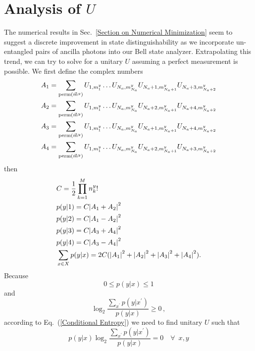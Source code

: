 \documentclass[aps,pra,twocolumn,showpacs,superscriptaddress,floatfix,10pt]{revtex4}
\begin{document}
\section{Analysis of $U$}
\label{Section on U Analysis}
The numerical results in Sec.~\ref{Section on Numerical Minimization} seem to suggest a discrete improvement in state distinguishability as we incorporate un-entangled pairs of ancilla photons into our Bell state analyzer. Extrapolating this trend, we can try to solve for a unitary $U$ assuming a perfect measurement is possible. 
We first define the complex numbers
\begin{eqnarray}
	\small{ A_1 = \sum\limits_{\textrm{perm}(\vec{m}^y)} U_{1,m^y_1} \dots U_{N_a,m^y_{N_a}} U_{N_a+1,m^y_{N_a+1}} U_{N_a+3,m^y_{N_a+2}}} \nonumber\\
	 A_2 = \sum\limits_{\textrm{perm}(\vec{m}^y)} U_{1,m^y_1} \dots U_{N_a,m^y_{N_a}} U_{N_a+2,m^y_{N_a+1}} U_{N_a+4,m^y_{N_a+2}} \nonumber\\
	 A_3 = \sum\limits_{\textrm{perm}(\vec{m}^y)} U_{1,m^y_1} \dots U_{N_a,m^y_{N_a}} U_{N_a+1,m^y_{N_a+1}} U_{N_a+4,m^y_{N_a+2}} \nonumber\\
	 A_4 = \sum\limits_{\textrm{perm}(\vec{m}^y)} U_{1,m^y_1} \dots U_{N_a,m^y_{N_a}} U_{N_a+2,m^y_{N_a+1}} U_{N_a+3,m^y_{N_a+2}} \nonumber
\end{eqnarray}
then
\begin{eqnarray}
	& C = \frac{1}{2}\prod_{k=1}^{M} n^y_k! \nonumber \\
	& p(y|1) = C \abs{A_1 + A_2}^2\nonumber \\
	& p(y|2) = C \abs{A_1 - A_2}^2 \\
	& p(y|3) = C \abs{A_3 + A_4}^2 \nonumber\\
	& p(y|4) = C \abs{A_3 - A_4}^2 \nonumber\\
	& \sum_{x \in X} p(y|x) = 2 C(\abs{A_1}^2 + \abs{A_2}^2 + \abs{A_3}^2 + \abs{A_4}^2 ). \nonumber
\end{eqnarray}
Because 
\begin{equation}
	0 \le p(y|x) \le 1
\end{equation}
and
\begin{equation}
	\log_2 \frac{\sum_{x^\prime} p(y|x^\prime)}{p(y|x)} \ge 0 \,,
\end{equation}
according to Eq.~(\ref{Conditional Entropy}) we need to find unitary $U$ such that
\begin{equation}
\label{Conditional Entropy Condition}
	 p(y|x) \log_2 \frac{\sum_{x^\prime} p(y|x^\prime)}{p(y|x)} = 0 \quad \forall \enspace x,y
\end{equation}
\end{document}
